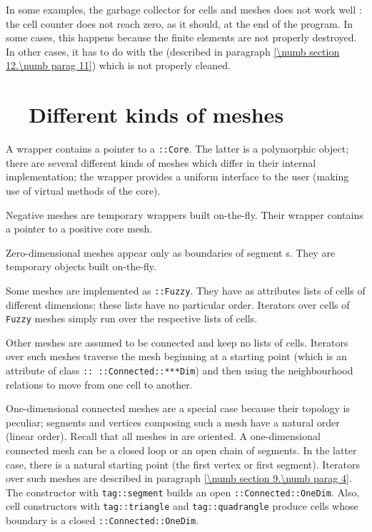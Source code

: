 In some examples, the garbage collector for cells and meshes does not work well :
the cell counter does not reach zero, as it should, at the end of the program.
In some cases, this happens because the finite elements are not properly destroyed.
In other cases, it has to do with the {\small\tt{}} (described in
paragraph \ref{\numb section 12.\numb parag 11}) which is not properly cleaned.


\section{~~Different kinds of meshes}\label{\numb section 11.\numb parag 6}   

A {\small\tt{}} wrapper contains a pointer to a {\small\tt{}::Core}.
The latter is a polymorphic object; there are several different kinds of meshes
which differ in their internal implementation; the wrapper provides a uniform interface
to the user (making use of virtual methods of the core).

Negative meshes are temporary wrappers built on-the-fly.
Their wrapper contains a pointer to a positive core mesh.

Zero-dimensional meshes appear only as boundaries of segment {\small\tt{}}s.
They are temporary objects built on-the-fly.

Some meshes are implemented as {\small\tt{}::Fuzzy}.
They have as attributes lists of cells of different dimensions;
these lists have no particular order.
Iterators over cells of {\small\tt Fuzzy} meshes simply run over the respective lists of cells.

Other meshes are assumed to be connected and keep no lists of cells.
Iterators over such meshes traverse the mesh beginning at a starting point (which is an attribute
of class {\small\tt{}:: ::Connected::***Dim}) and then using the neighbourhood relations
to move from one cell to another.

One-dimensional connected meshes are a special case because their topology is peculiar;
segments and vertices composing such a mesh have a natural order (linear order).
Recall that all meshes in {\maniFEM} are oriented.
A one-dimensional connected mesh can be a closed loop or an open chain of segments.
In the latter case, there is a natural starting point (the first vertex or first segment).
Iterators over such meshes are described in paragraph \ref{\numb section 9.\numb parag 4}.
The {\small\tt{}} constructor with {\small\tt \textcolor{tag}{tag}::segment}
builds an open {\small\tt{}::Connected::OneDim}.
Also, cell constructors with {\small\tt \textcolor{tag}{tag}::triangle} and
{\small\tt \textcolor{tag}{tag}::quadrangle} produce cells
whose boundary is a closed {\small\tt{}::Connected::OneDim}.

